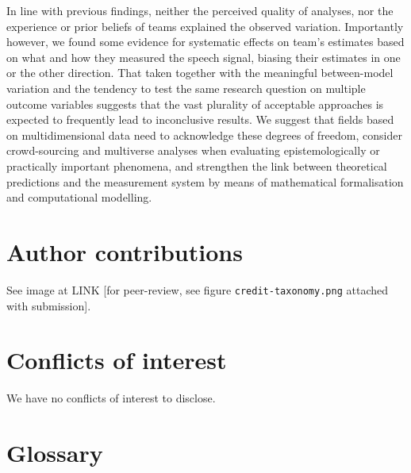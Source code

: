 \documentclass[Review,times,sageh]{sagej}
\begin{document}
In line with previous findings, neither the perceived quality of analyses, nor the experience or prior beliefs of teams explained the observed variation.
Importantly however, we found some evidence for systematic effects on team's estimates based on what and how they measured the speech signal, biasing their estimates in one or the other direction.
That taken together with the meaningful between-model variation and the tendency to test the same research question on multiple outcome variables suggests that the vast plurality of acceptable approaches is expected to frequently lead to inconclusive results.
We suggest that fields based on multidimensional data need to acknowledge these degrees of freedom, consider crowd-sourcing and multiverse analyses when evaluating epistemologically or practically important phenomena, and strengthen the link between theoretical predictions and the measurement system by means of mathematical formalisation and computational modelling.

\hypertarget{author-contributions}{%
\section{Author contributions}\label{author-contributions}}

See image at LINK {[}for peer-review, see figure \texttt{credit-taxonomy.png} attached with submission{]}.

\hypertarget{conflicts-of-interest}{%
\section{Conflicts of interest}\label{conflicts-of-interest}}

We have no conflicts of interest to disclose.

\appendix

\hypertarget{glossary}{%
\section{Glossary}\label{glossary}}
\end{document}

